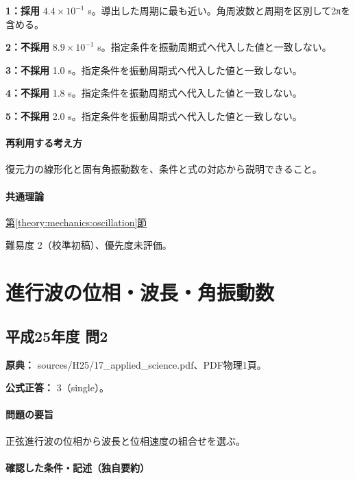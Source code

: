 \noindent\textbf{1：採用} \(4.4\times10^{-1}\) s。導出した周期に最も近い。角周波数と周期を区別して2πを含める。\par

\noindent\textbf{2：不採用} \(8.9\times10^{-1}\) s。指定条件を振動周期式へ代入した値と一致しない。\par

\noindent\textbf{3：不採用} 1.0 s。指定条件を振動周期式へ代入した値と一致しない。\par

\noindent\textbf{4：不採用} 1.8 s。指定条件を振動周期式へ代入した値と一致しない。\par

\noindent\textbf{5：不採用} 2.0 s。指定条件を振動周期式へ代入した値と一致しない。\par

\paragraph{再利用する考え方} 復元力の線形化と固有角振動数を、条件と式の対応から説明できること。

\paragraph{共通理論} \hyperref[theory:mechanics:oscillation]{第\ref*{theory:mechanics:oscillation}節}

\par 難易度 2（校準初稿）、優先度未評価。

\section{進行波の位相・波長・角振動数}

\subsection{平成25年度 問2}
\label{q:h25-reg-applied-02}

\noindent\textbf{原典：} sources/H25/17\_applied\_science.pdf、PDF物理1頁。

\textbf{公式正答：} 3（single）。

\paragraph{問題の要旨} 正弦進行波の位相から波長と位相速度の組合せを選ぶ。

\paragraph{確認した条件・記述（独自要約）}\mbox{}\par

